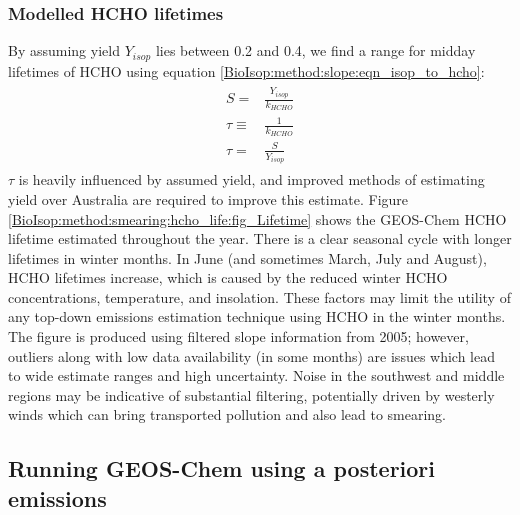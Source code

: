     \subsubsection{Modelled HCHO lifetimes}
      \label{BioIsop:method:smearing:hcho_life}
      By assuming yield $Y_{isop}$ lies between 0.2 and 0.4, we find a range for midday lifetimes of HCHO using equation \ref{BioIsop:method:slope:eqn_isop_to_hcho}:
      \begin{eqnarray} \begin{split}
      \label{Model:results:hcho_life:eqn_smearing_vs_yield}
      S = & \frac{Y_{isop}}{k_{HCHO}} \\
      \tau \equiv & \frac{1}{k_{HCHO}} \\
      \tau = & \frac{S}{Y_{isop}}
      \end{split} \end{eqnarray}
      $\tau$ is heavily influenced by assumed yield, and improved methods of estimating yield over Australia are required to improve this estimate.
      Figure \ref{BioIsop:method:smearing:hcho_life:fig_Lifetime} shows the GEOS-Chem HCHO lifetime estimated throughout the year.
      There is a clear seasonal cycle with longer lifetimes in winter months.
      In June (and sometimes March, July and August), HCHO lifetimes increase, which is caused by the reduced winter HCHO concentrations, temperature, and insolation.
      These factors may limit the utility of any top-down emissions estimation technique using HCHO in the winter months.
      The figure is produced using filtered slope information from 2005; however, outliers along with low data availability (in some months) are issues which lead to wide estimate ranges and high uncertainty.
      Noise in the southwest and middle regions may be indicative of substantial filtering, potentially driven by westerly winds which can bring transported pollution and also lead to smearing.
      
    
  \subsection{Running GEOS-Chem using a posteriori emissions}
  \label{BioIsop:method:scaled}
    
